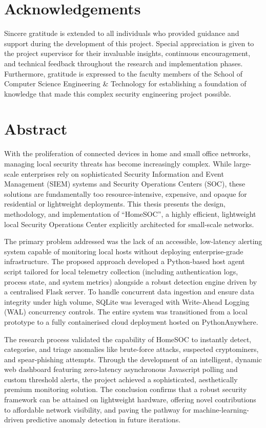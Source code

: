 \clearpage

\chapter*{Acknowledgements}
Sincere gratitude is extended to all individuals who provided guidance and support during the development of this project. Special appreciation is given to the project supervisor for their invaluable insights, continuous encouragement, and technical feedback throughout the research and implementation phases. Furthermore, gratitude is expressed to the faculty members of the School of Computer Science Engineering \& Technology for establishing a foundation of knowledge that made this complex security engineering project possible. 

\clearpage

\chapter*{Abstract}
With the proliferation of connected devices in home and small office networks, managing local security threats has become increasingly complex. While large-scale enterprises rely on sophisticated Security Information and Event Management (SIEM) systems and Security Operations Centers (SOC), these solutions are fundamentally too resource-intensive, expensive, and opaque for residential or lightweight deployments. This thesis presents the design, methodology, and implementation of ``HomeSOC'', a highly efficient, lightweight local Security Operations Center explicitly architected for small-scale networks. 

The primary problem addressed was the lack of an accessible, low-latency alerting system capable of monitoring local hosts without deploying enterprise-grade infrastructure. The proposed approach developed a Python-based host agent script tailored for local telemetry collection (including authentication logs, process state, and system metrics) alongside a robust detection engine driven by a centralised Flask server. To handle concurrent data ingestion and ensure data integrity under high volume, SQLite was leveraged with Write-Ahead Logging (WAL) concurrency controls. The entire system was transitioned from a local prototype to a fully containerised cloud deployment hosted on PythonAnywhere. 

The research process validated the capability of HomeSOC to instantly detect, categorise, and triage anomalies like brute-force attacks, suspected cryptominers, and spear-phishing attempts. Through the development of an intelligent, dynamic web dashboard featuring zero-latency asynchronous Javascript polling and custom threshold alerts, the project achieved a sophisticated, aesthetically premium monitoring solution. The conclusion confirms that a robust security framework can be attained on lightweight hardware, offering novel contributions to affordable network visibility, and paving the pathway for machine-learning-driven predictive anomaly detection in future iterations.

